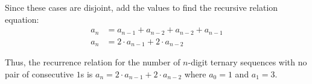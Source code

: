 \documentclass[12pt]{article}
\begin{document}
Since these cases are disjoint, add the values to find the recursive relation equation:
\begin{align*}
a_{n} &= a_{n-1} + a_{n-2} + a_{n-2} + a_{n-1} \\
a_{n} &= 2 \cdot a_{n - 1} +  2 \cdot a_{n - 2}
\end{align*}


Thus, the recurrence relation for the number of $n$-digit ternary sequences with no pair of consecutive $1$s is $a_{n} = 2 \cdot a_{n - 1} +  2 \cdot a_{n - 2}$ where $a_{0} = 1$ and $a_{1} = 3$.\\
 
\end{document}
